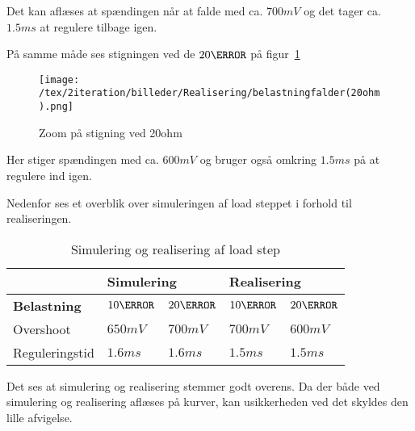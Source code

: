 \noindent Det kan aflæses at spændingen når at falde med ca. $700mV$ og det tager ca. $1.5ms$ at regulere tilbage igen.

\noindent På samme måde ses stigningen ved de $20\ohm$ på figur~\ref{fig:belastning_20ohm}
\begin{figure}[H]
	\center
	\texttt{[image: /tex/2iteration/billeder/Realisering/belastningfalder(20ohm).png]}
	\caption{Zoom på stigning ved 20ohm}
	\label{fig:belastning_20ohm}
\end{figure}
\noindent Her stiger spændingen med ca. $600mV$ og bruger også omkring $1.5ms$ på at regulere ind igen. 

\noindent Nedenfor ses et overblik over simuleringen af load steppet i forhold til realiseringen. 

\begin{table}[H] 			
	\centering
	\begin{tabularx}{\textwidth}{|X|l|l|l|l|}
		\hline
		& \multicolumn{2}{|l|}{\textbf{Simulering}} & \multicolumn{2}{|l|}{\textbf{Realisering}} \\ \hline
		\textbf{Belastning} & $10\ohm$ & $20\ohm$ & $10\ohm$ & $20\ohm$ \\ \hline
		Overshoot & $650mV$ & $700mV$ & $700mV$ & $600mV$  \\ \hline
		Reguleringstid & $1.6ms$ & $1.6ms$ & $1.5ms$ & $1.5ms$ \\ \hline
	\end{tabularx}
	\caption{Simulering og realisering af load step}
	\label{tab:Loadstep}
\end{table}
\noindent Det ses at simulering og realisering stemmer godt overens. Da der både ved simulering og realisering aflæses på kurver, kan usikkerheden ved det skyldes den lille afvigelse.

















